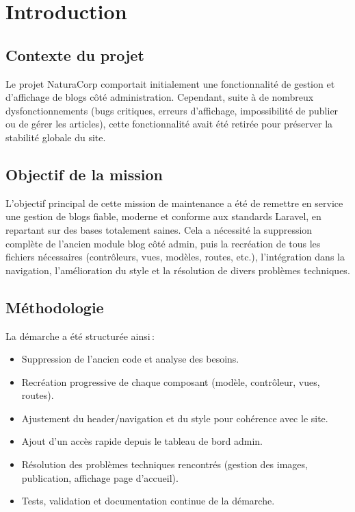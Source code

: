 \documentclass[a4paper,12pt]{report}
\begin{document}
\newpage

\section{Introduction}
\subsection{Contexte du projet}
Le projet NaturaCorp comportait initialement une fonctionnalité de gestion et d'affichage de blogs côté administration. Cependant, suite à de nombreux dysfonctionnements (bugs critiques, erreurs d’affichage, impossibilité de publier ou de gérer les articles), cette fonctionnalité avait été retirée pour préserver la stabilité globale du site.

\subsection{Objectif de la mission}
L’objectif principal de cette mission de maintenance a été de remettre en service une gestion de blogs fiable, moderne et conforme aux standards Laravel, en repartant sur des bases totalement saines. Cela a nécessité la suppression complète de l’ancien module blog côté admin, puis la recréation de tous les fichiers nécessaires (contrôleurs, vues, modèles, routes, etc.), l’intégration dans la navigation, l’amélioration du style et la résolution de divers problèmes techniques.

\subsection{Méthodologie}
La démarche a été structurée ainsi :
\begin{itemize}
    \item Suppression de l’ancien code et analyse des besoins.
    \item Recréation progressive de chaque composant (modèle, contrôleur, vues, routes).
    \item Ajustement du header/navigation et du style pour cohérence avec le site.
    \item Ajout d’un accès rapide depuis le tableau de bord admin.
    \item Résolution des problèmes techniques rencontrés (gestion des images, publication, affichage page d’accueil).
    \item Tests, validation et documentation continue de la démarche.
\end{itemize}
\end{document}
